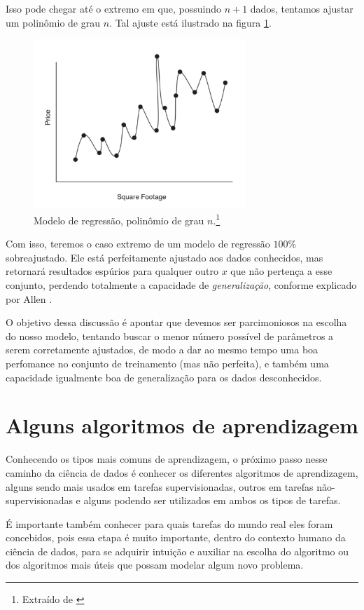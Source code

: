 Isso pode chegar até o extremo em que, possuindo $n{+}1$ dados, tentamos ajustar um polinômio de grau $n$. Tal ajuste está ilustrado na figura \ref{fig:over_reg_3}.

\begin{figure}[htb]
\centering
\includegraphics[width=8cm]{figuras/over_reg_3}
\caption{Modelo de regressão, polinômio de grau $n$.\footnote{Extraído de \citep{allen}}}
\label{fig:over_reg_3}
\end{figure}

Com isso, teremos o caso extremo de um modelo de regressão $100\%$ sobreajustado. Ele está perfeitamente ajustado aos dados conhecidos, mas retornará resultados espúrios para qualquer outro $x$ que não pertença a esse conjunto, perdendo totalmente a capacidade de \emph{generalização}, conforme explicado por Allen \citep{allen}.

O objetivo dessa discussão é apontar que devemos ser parcimoniosos na escolha do nosso modelo, tentando buscar o menor número possível de parâmetros a serem corretamente ajustados, de modo a dar ao mesmo tempo uma boa perfomance no conjunto de treinamento (mas não perfeita), e também uma capacidade igualmente boa de generalização para os dados desconhecidos.

\section{Alguns algoritmos de aprendizagem}

Conhecendo os tipos mais comuns de aprendizagem, o próximo passo nesse caminho da ciência de dados é conhecer os diferentes algoritmos de aprendizagem, alguns sendo mais usados em tarefas supervisionadas, outros em tarefas não-supervisionadas e alguns podendo ser utilizados em ambos os tipos de tarefas.

É importante também conhecer para quais tarefas do mundo real eles foram concebidos, pois essa etapa é muito importante, dentro do contexto humano da ciência de dados, para se adquirir intuição e auxiliar na escolha do algoritmo ou dos algoritmos mais úteis que possam modelar algum novo problema.

